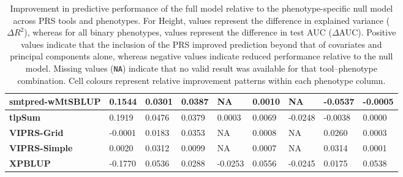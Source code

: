 \documentclass[pdflatex,sn-basic]{sn-jnl}
\begin{document}
\begin{table}[!ht]
{\begin{tabular}{|l|l|l|l|l|l|l|l|l|}
\hline
\textbf{smtpred-wMtSBLUP} & \cellcolor[HTML]{C3DA81}0.1544 & \cellcolor[HTML]{FEE983}0.0301 & \cellcolor[HTML]{EDE683}0.0387 & NA& \cellcolor[HTML]{FEE883}0.0010 & NA& \cellcolor[HTML]{F8696B}-0.0537 & \cellcolor[HTML]{FEE683}-0.0005 \\
\hline
\textbf{tlpSum} & \cellcolor[HTML]{A5D17F}0.1919 & \cellcolor[HTML]{A8D27F}0.0476 & \cellcolor[HTML]{EEE784}0.0379 & \cellcolor[HTML]{EBE583}0.0003 & \cellcolor[HTML]{FEEB84}0.0069 & \cellcolor[HTML]{FEEA83}-0.0248 & \cellcolor[HTML]{FDD27F}-0.0038 & \cellcolor[HTML]{FEE983}0.0000 \\
\hline
\textbf{VIPRS-Grid} & \cellcolor[HTML]{FDCC7E}-0.0001 & \cellcolor[HTML]{FDCF7E}0.0183 & \cellcolor[HTML]{F3E884}0.0353 & NA& \cellcolor[HTML]{FEE883}0.0008 & NA& \cellcolor[HTML]{DDE283}0.0260 & \cellcolor[HTML]{FFEB84}0.0003 \\
\hline
\textbf{VIPRS-Simple} & \cellcolor[HTML]{FDCD7E}0.0020 & \cellcolor[HTML]{FDEB84}0.0312 & \cellcolor[HTML]{FDC67D}0.0099 & NA& \cellcolor[HTML]{FEE883}0.0007 & NA& \cellcolor[HTML]{D3DF82}0.0314 & \cellcolor[HTML]{FEEA83}0.0001 \\
\hline
\textbf{XPBLUP} & \cellcolor[HTML]{F98871}-0.1770 & \cellcolor[HTML]{88C97E}0.0536 & \cellcolor[HTML]{FFEB84}0.0288 & \cellcolor[HTML]{FBA175}-0.0253 & \cellcolor[HTML]{93CC7E}0.0556 & \cellcolor[HTML]{FFEB84}-0.0245 & \cellcolor[HTML]{EEE683}0.0175 & \cellcolor[HTML]{77C47D}0.0538 \\
\hline
\end{tabular}%
}
\caption{Improvement in predictive performance of the full model relative to the phenotype-specific null model across PRS tools and phenotypes. For Height, values represent the difference in explained variance ($\Delta R^2$), whereas for all binary phenotypes, values represent the difference in test AUC ($\Delta$AUC). Positive values indicate that the inclusion of the PRS improved prediction beyond that of covariates and principal components alone, whereas negative values indicate reduced performance relative to the null model. Missing values (\texttt{NA}) indicate that no valid result was available for that tool--phenotype combination. Cell colours represent relative improvement patterns within each phenotype column.}
\label{TablePRSImprovement}
\end{table}
\end{document}
